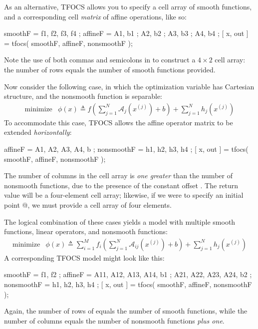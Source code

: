 \documentclass{article}
\newcommand{\cA}{\ensuremath{\mathcal{A}}}    %
\newcommand{\<}{\langle}
\renewcommand{\>}{\rangle}
\begin{document}
As an alternative, TFOCS allows you to specify a cell array of smooth
functions, and a corresponding cell \emph{matrix} of affine operations, like so:
\begin{code}
	smoothF = { f1, f2, f3, f4 };
	affineF = { A1, b1 ; A2, b2 ; A3, b3 ; A4, b4 };
	[ x, out ] = tfocs( smoothF, affineF, nonsmoothF );
\end{code}
Note the use of both commas and semicolons in \verb@affineF@ to construct
a $4\times 2$ cell array: the number of rows equals the number
of smooth functions provided. 

Now consider the following case, in which the optimization variable has
Cartesian structure, and the nonsmooth function is separable:
\begin{equation}
	\begin{array}{ll}
		\text{minimize} & \phi(x) \triangleq f(\sum_{j=1}^N\cA_j(x^{(j)})+b) + \sum_{j=1}^N h_j(x^{(j)})
	\end{array}		
\end{equation}
To accommodate this case, TFOCS allows the affine operator matrix
to be extended \emph{horizontally}:
\begin{code}
	affineF = { A1, A2, A3, A4, b };
	nonsmoothF = { h1, h2, h3, h4 };
	[ x, out ] = tfocs( smoothF, affineF, nonsmoothF );
\end{code}
The number of columns in the cell array is
\emph{one greater} than the number of nonsmooth functions, due to the
presence of the constant offset \verb@b@. The return value \verb@x@ 
will be a four-element cell array; likewise, if we were to specify
an initial point @, we must provide a cell
array of four elements.

The logical combination of these cases yields a model
with multiple smooth functions, linear operators, and
nonsmooth functions:
\begin{equation}
	\begin{array}{ll}
		\text{minimize} & \phi(x) \triangleq \sum_{i=1}^M f_i(\sum_{j=1}^N \cA_{ij}(x^{(j)})+b) + \sum_{j=1}^N h_j(x^{(j)})
	\end{array}		
\end{equation}
A corresponding TFOCS model might look like this:
\begin{code}
	smoothF = { f1, f2 };
	affineF = { A11, A12, A13, A14, b1 ; A21, A22, A23, A24, b2 };
	nonsmoothF = { h1, h2, h3, h4 };
	[ x, out ] = tfocs( smoothF, affineF, nonsmoothF );
\end{code}
Again, the number of rows of \verb@affineF@ equals the number of
smooth functions, while
the number of columns equals the number of nonsmooth
functions \emph{plus one}.
\end{document}
